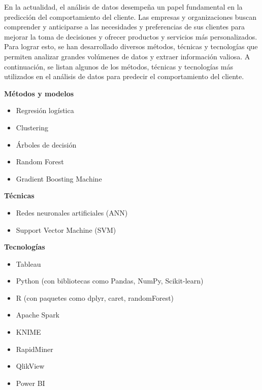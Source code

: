 En la actualidad, el análisis de datos desempeña un papel fundamental en la predicción del comportamiento del cliente. Las empresas y organizaciones buscan comprender y anticiparse a las necesidades y preferencias de sus clientes para mejorar la toma de decisiones y ofrecer productos y servicios más personalizados. Para lograr esto, se han desarrollado diversos métodos, técnicas y tecnologías que permiten analizar grandes volúmenes de datos y extraer información valiosa. 
A continuación, se listan algunos de los métodos, técnicas y tecnologías más utilizados en el análisis de datos para predecir el comportamiento del cliente.
\vspace{0.5cm}

\textbf{\large Métodos y modelos}
\begin{itemize}
    \item Regresión logística
    \item Clustering
    \item Árboles de decisión
    \item Random Forest
    \item Gradient Boosting Machine
\end{itemize}
\vspace{0.5cm}

\textbf{\large Técnicas}
\begin{itemize}
    \item Redes neuronales artificiales (ANN)
    \item Support Vector Machine (SVM)
\end{itemize}
\vspace{0.5cm}

\textbf{\large Tecnologías} 
\begin{itemize}
    \item Tableau
    \item Python (con bibliotecas como Pandas, NumPy, Scikit-learn)
    \item R (con paquetes como dplyr, caret, randomForest)
    \item Apache Spark
    \item KNIME
    \item RapidMiner
    \item QlikView
    \item Power BI
\end{itemize}
